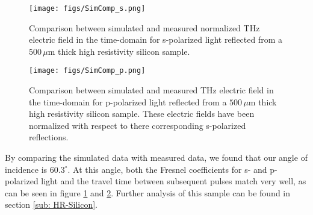 \begin{figure}[H]
\begin{center}
\texttt{[image: figs/SimComp\_s.png]}
\end{center}
\caption[Comparison of measured and simulated p-polarized terahertz electric field in time for high resistivity silicon]{\label{fig:ES_Comp} Comparison between simulated and measured normalized THz electric field in the time-domain for s-polarized light reflected from a $500\,\mu$m thick high resistivity silicon sample.}
\end{figure}

\begin{figure}[H]
\begin{center}
\texttt{[image: figs/SimComp\_p.png]}
\end{center}
\caption[Comparison of measured and simulated p-polarized terahertz electric field in time for high resistivity silicon]{\label{fig:EP_comp} Comparison between simulated and measured THz electric field in the time-domain for p-polarized light reflected from a $500\,\mu$m thick high resistivity silicon sample. These electric fields have been normalized with respect to there corresponding s-polarized reflections.}
\end{figure}

By comparing the simulated data with measured data, we found that our angle of incidence is $60.3^{\circ}$. At this angle, both the Fresnel coefficients for s- and  p-polarized light and the travel time between subsequent pulses match very well, as can be seen in figure \ref{fig:ES_Comp} and \ref{fig:EP_comp}.
Further analysis of this sample can be found in section \ref{sub: HR-Silicon}.

\endinput